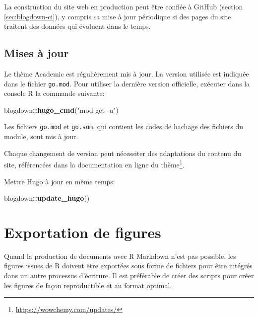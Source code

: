 \documentclass[
  12pt,
  french,
  a4paper,
  extrafontsizes,onecolumn,openright
  ]{memoir}
\newenvironment{Shaded}{\begin{snugshade}}{\end{snugshade}}
\newcommand{\KeywordTok}[1]{\textcolor[rgb]{0.13,0.29,0.53}{\textbf{#1}}}
\newcommand{\NormalTok}[1]{#1}
\newcommand{\OperatorTok}[1]{\textcolor[rgb]{0.81,0.36,0.00}{\textbf{#1}}}
\newcommand{\StringTok}[1]{\textcolor[rgb]{0.31,0.60,0.02}{#1}}
\begin{document}
La construction du site web en production peut être confiée à GitHub (section \ref{sec:blogdown-ci}), y compris sa mise à jour périodique si des pages du site traitent des données qui évoluent dans le temps.

\hypertarget{mises-uxe0-jour-1}{%
\subsection{Mises à jour}\label{mises-uxe0-jour-1}}

Le thème Academic est régulièrement mis à jour.
La version utilisée est indiquée dans le fichier \texttt{go.mod}.
Pour utiliser la dernière version officielle, exécuter dans la console R la commande suivante:

\scriptsize

\begin{Shaded}
\begin{Highlighting}[]
\NormalTok{blogdown}\OperatorTok{::}\KeywordTok{hugo_cmd}\NormalTok{(}\StringTok{"mod get -u"}\NormalTok{)}
\end{Highlighting}
\end{Shaded}

\normalsize

Les fichiers \texttt{go.mod} et \texttt{go.sum}, qui contient les codes de hachage des fichiers du module, sont mis à jour.

Chaque changement de version peut nécessiter des adaptations du contenu du site, référencées dans la documentation en ligne du thème\footnote{\url{https://wowchemy.com/updates/}}.

Mettre Hugo à jour en même temps:

\scriptsize

\begin{Shaded}
\begin{Highlighting}[]
\NormalTok{blogdown}\OperatorTok{::}\KeywordTok{update_hugo}\NormalTok{()}
\end{Highlighting}
\end{Shaded}

\normalsize

\hypertarget{exportation-de-figures}{%
\section{Exportation de figures}\label{exportation-de-figures}}

Quand la production de documents avec R Markdown n'est pas possible, les figures issues de R doivent être exportées sous forme de fichiers pour être intégrés dans un autre processus d'écriture.
Il est préférable de créer des scripts pour créer les figures de façon reproductible et au format optimal.
\end{document}
